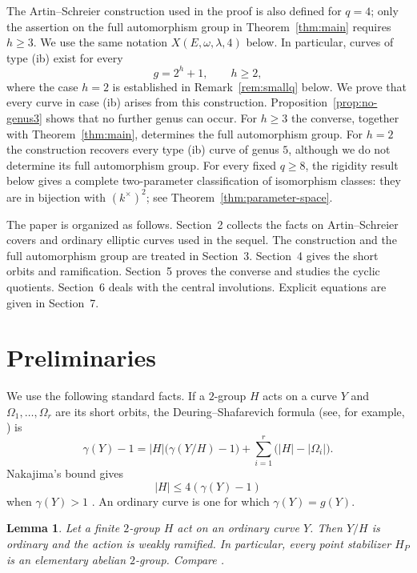 \documentclass[11pt]{article}
\newtheorem{lemma}[theorem]{Lemma}
\theoremstyle{remark}
\begin{document}
The Artin--Schreier construction used in the proof is also defined for
$q=4$; only the assertion on the full automorphism group in
Theorem~\ref{thm:main} requires $h\ge3$.  We use the same notation
$X(E,\omega,\lambda,4)$ below.  In particular, curves of type
\textup{(ib)} exist for every
\[
        g=2^h+1,\qquad h\ge2,
\]
where the case $h=2$ is established in Remark~\ref{rem:smallq} below.
We prove that every curve in case \textup{(ib)} arises from this
construction.  Proposition~\ref{prop:no-genus3} shows that no further
genus can occur.  For $h\ge3$ the converse, together with
Theorem~\ref{thm:main}, determines the full automorphism group.  For
$h=2$ the construction recovers every type \textup{(ib)} curve of genus
$5$, although we do not determine its full automorphism group.  For every
fixed $q\ge8$, the rigidity result below gives a complete two-parameter
classification of isomorphism classes: they are in bijection with
$(k^\times)^2$; see Theorem~\ref{thm:parameter-space}.

The paper is organized as follows.  Section~2 collects the facts on
Artin--Schreier covers and ordinary elliptic curves used in the sequel.
The construction and the full automorphism group are treated in
Section~3.  Section~4 gives the short orbits and ramification.
Section~5 proves the converse and studies the cyclic quotients.
Section~6 deals with the central involutions.  Explicit equations are
given in Section~7.

\section{Preliminaries}\label{sec:prelim}

We use the following standard facts.  If a $2$-group $H$ acts on a curve
$Y$ and $\Omega_1,\ldots,\Omega_r$ are its short orbits, the
Deuring--Shafarevich formula (see, for example, \cite{Subrao,NakajimaDS}) is
\begin{equation}\label{eq:DS}
 \gamma(Y)-1
 =|H|\bigl(\gamma(Y/H)-1\bigr)
  +\sum_{i=1}^r\bigl(|H|-|\Omega_i|\bigr).
\end{equation}
Nakajima's bound gives
\begin{equation}\label{eq:Nakajima}
        |H|\le4(\gamma(Y)-1)
\end{equation}
when $\gamma(Y)>1$ \cite[Theorem~1]{Nakajima}.  An ordinary curve is one for which
$\gamma(Y)=g(Y)$.

\begin{lemma}\label{lem:ordinary-weak}
Let a finite $2$-group $H$ act on an ordinary curve $Y$.  Then $Y/H$ is
ordinary and the action is weakly ramified.  In particular, every point
stabilizer $H_P$ is an elementary abelian $2$-group.  Compare
\cite{NakajimaDS}.
\end{lemma}
\end{document}
